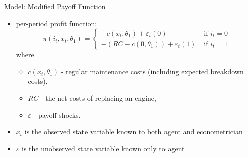 \documentclass[xcolor=pdftex,dvipsnames,table,mathserif,aspectratio=169]{beamer}
\begin{document}
\begin{frame}{Model: Modified Payoff Function}
\begin{itemize}
	\item per-period profit function:\[
		\pi \left(i_{t},x_{t},\theta_{1}\right)=
		\begin{cases}
		-c\left(x_{t},\theta_{1}\right)+\varepsilon_{t}\left(0\right) & \mbox{ if }i_{t}=0\\		
		-\left(RC-c\left(0,\theta_{1}\right)\right)+\varepsilon_{t}\left(1\right) & \mbox{ if }i_{t}=1
		\end{cases}
		\]
	where \\
	\begin{itemize}
		\item $c\left(x_{t},\theta_{1}\right) $ -  regular maintenance costs (including expected breakdown costs),
		\item $RC$ - the net costs of replacing an engine,
		\item $\varepsilon$ - payoff shocks.
	\end{itemize}
	
	\item $x_{t}$ is the \alert{observed state variable} known to both agent and econometrician
	\item $\varepsilon$ is the \alert{unobserved state variable} known only to agent
\end{itemize}
\end{frame}
\end{document}
